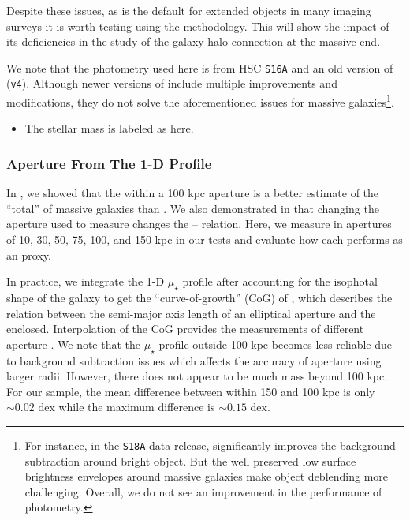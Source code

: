 \documentclass[fleqn,usenatbib,useAMS,english]{mnras}
\begin{document}
    Despite these issues, as \cmodel{} is the default for extended objects in many imaging
    surveys it is worth testing using the \topn{} methodology. This will show the impact of its
    deficiencies in the study of the galaxy-halo connection at the massive end.

    We note that the \cmodel{} photometry used here is from HSC \texttt{S16A} and an old
    version of \hscpipe{} (\texttt{v4}).
    Although newer versions of \hscpipe{} include multiple improvements and modifications,
    they do not solve the aforementioned issues for massive galaxies\footnote{ For instance, in the
    {\tt S18A} data release, \hscpipe{} significantly improves the background subtraction around
    bright object. But the well preserved low surface brightness envelopes around massive
    galaxies make object deblending more challenging. Overall, we do not see an improvement in
    the performance of \cmodel{} photometry. }.

    \begin{itemize}
        \item The \cmodel{} stellar mass is labeled as \mcmodel{} here.
    \end{itemize}

\subsubsection{Aperture \mstar{} From The 1-D Profile}
    \label{sec:maper}

    In \citet{Huang2018b}, we showed that the \mstar{} within a 100 kpc aperture is a better estimate
    of the ``total'' \mstar{} of massive galaxies than \mcmodel{}. We also demonstrated in
    \citet{Huang2018c, Huang2020} that changing the aperture used to measure \mstar{} changes the
    \mstar{}--\mvir{} relation.
    Here, we measure \mstar{} in apertures of 10, 30, 50, 75, 100, and 150 kpc in
    our \topn{} tests and evaluate how each performs as an \mvir{} proxy.

    In practice, we integrate the 1-D $\mu_{\star}$ profile after accounting for the isophotal
    shape of the galaxy to get the ``curve-of-growth'' (CoG) of \mstar{}, which describes the relation
    between the semi-major axis length of an elliptical aperture and the \mstar{} enclosed.
    Interpolation of the CoG provides the measurements of different aperture \mstar{}.
    We note that the $\mu_{\star}$ profile outside 100 kpc becomes less reliable due to background
    subtraction issues which affects the accuracy of aperture \mstar{} using larger radii.
    However, there does not appear to be much mass beyond 100 kpc.
    For our sample, the mean difference between \mstar{} within 150 and 100 kpc is only
    $\sim 0.02$ dex while the maximum difference is $\sim 0.15$ dex.
\end{document}
